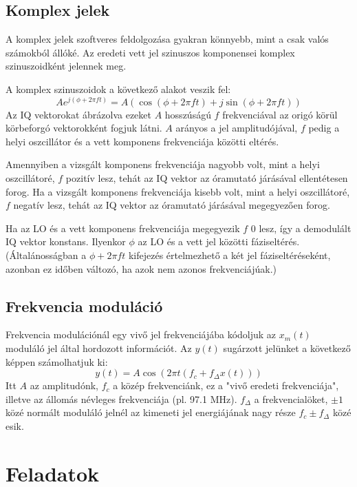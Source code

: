 \documentclass[12pt,a4paper]{article}
\begin{document}
\subsection{Komplex jelek}

A komplex jelek szoftveres feldolgozása gyakran könnyebb, mint a csak valós számokból állóké.
Az eredeti vett jel szinuszos komponensei komplex szinuszoidként jelennek meg.

A komplex szinuszoidok a következő alakot veszik fel:
\[
  A e^{j(\phi +  2 \pi f t)} = A ( \cos (\phi + 2 \pi f t)  +  j \sin (\phi + 2 \pi f t))
\]
Az IQ vektorokat ábrázolva ezeket $A$ hosszúságú $f$ frekvenciával az origó körül körbeforgó vektorokként fogjuk látni.
$A$ arányos a jel amplitudójával, $f$ pedig a helyi oszcillátor és a vett komponens frekvenciája közötti eltérés.

Amennyiben a vizsgált komponens frekvenciája nagyobb volt, mint a helyi oszcillátoré, $f$ pozitív lesz, tehát az IQ vektor
az óramutató járásával ellentétesen forog.
Ha a vizsgált komponens frekvenciája kisebb volt, mint a helyi oszcillátoré, $f$ negatív lesz, tehát az IQ vektor
az óramutató járásával megegyezően forog.

Ha az LO és a vett komponens frekvenciája megegyezik $f$ 0 lesz, így a demodulált IQ vektor konstans.
Ilyenkor $\phi$ az LO és a vett jel közötti fáziseltérés.
(Általánosságban a $\phi + 2\pi ft$ kifejezés értelmezhető a két jel fáziseltéréseként, azonban ez időben változó, ha azok nem azonos frekvenciájúak.)


\subsection{Frekvencia moduláció}

Frekvencia modulációnál egy vivő jel frekvenciájába kódoljuk az $x_m(t)$ moduláló jel által hordozott információt. Az $y(t)$ sugárzott jelünket a következő képpen számolhatjuk ki:
\[
  y(t) = A \cos(2 \pi t ( f_c + f_{\Delta} x(t) ) )
\]
Itt $A$ az amplitudónk, $f_c$ a közép frekvenciánk, ez a "vivő eredeti frekvenciája", illetve az állomás névleges frekvenciája (pl. 97.1 MHz). 
$f_{\Delta}$ a frekvencialöket, $\pm 1$ közé normált moduláló jelnél az kimeneti jel energiájának nagy része $f_c \pm f_{\Delta}$ közé esik.

\clearpage
\section{Feladatok}
\end{document}
